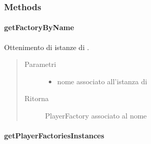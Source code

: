 \documentclass[letterpaper,10pt,italian]{sphinxmanual}
\begin{document}
\subsubsection{Methods}
\label{\detokenize{source/it/unicam/cs/pa/mastermind/players/PlayerFactoryRegistry:methods}}

\paragraph{getFactoryByName}
\label{\detokenize{source/it/unicam/cs/pa/mastermind/players/PlayerFactoryRegistry:getfactorybyname}}

\begin{fulllineitems}
\label{\detokenize{source/it/unicam/cs/pa/mastermind/players/PlayerFactoryRegistry:it.unicam.cs.pa.mastermind.players.PlayerFactoryRegistry.getFactoryByName(String)}}
Ottenimento di istanze di .
\begin{quote}\begin{description}
\item[{Parametri}] \leavevmode\begin{itemize}
\item {} 
 \textendash{} nome associato all’istanza di 

\end{itemize}

\item[{Ritorna}] \leavevmode
PlayerFactory associato al nome

\end{description}\end{quote}

\end{fulllineitems}



\paragraph{getPlayerFactoriesInstances}
\label{\detokenize{source/it/unicam/cs/pa/mastermind/players/PlayerFactoryRegistry:getplayerfactoriesinstances}}
\end{document}
